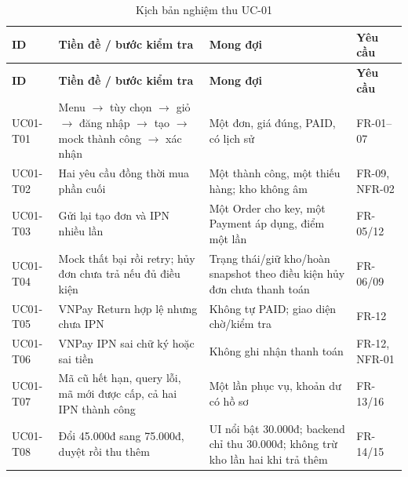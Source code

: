 \begin{longtable}{|>{\raggedright\arraybackslash}p{}|>{\raggedright\arraybackslash}p{}|>{\raggedright\arraybackslash}p{}|>{\raggedright\arraybackslash}p{}|}
\caption{Kịch bản nghiệm thu UC-01}\\\hline
\textbf{ID} & \textbf{Tiền đề / bước kiểm tra} & \textbf{Mong đợi} & \textbf{Yêu cầu} \\ \hline
\endfirsthead
\hline
\textbf{ID} & \textbf{Tiền đề / bước kiểm tra} & \textbf{Mong đợi} & \textbf{Yêu cầu} \\ \hline
\endhead
UC01-T01 & Menu \(\rightarrow\) tùy chọn \(\rightarrow\) giỏ \(\rightarrow\) đăng nhập \(\rightarrow\) tạo \(\rightarrow\) mock thành công \(\rightarrow\) xác nhận & Một đơn, giá đúng, PAID, có lịch sử & FR-01--07 \\ \hline
UC01-T02 & Hai yêu cầu đồng thời mua phần cuối & Một thành công, một thiếu hàng; kho không âm & FR-09, NFR-02 \\ \hline
UC01-T03 & Gửi lại tạo đơn và IPN nhiều lần & Một Order cho key, một Payment áp dụng, điểm một lần & FR-05/12 \\ \hline
UC01-T04 & Mock thất bại rồi retry; hủy đơn chưa trả nếu đủ điều kiện & Trạng thái/giữ kho/hoàn snapshot theo điều kiện hủy đơn chưa thanh toán & FR-06/09 \\ \hline
UC01-T05 & VNPay Return hợp lệ nhưng chưa IPN & Không tự PAID; giao diện chờ/kiểm tra & FR-12 \\ \hline
UC01-T06 & VNPay IPN sai chữ ký hoặc sai tiền & Không ghi nhận thanh toán & FR-12, NFR-01 \\ \hline
UC01-T07 & Mã cũ hết hạn, query lỗi, mã mới được cấp, cả hai IPN thành công & Một lần phục vụ, khoản dư có hồ sơ & FR-13/16 \\ \hline
UC01-T08 & Đổi 45.000đ sang 75.000đ, duyệt rồi thu thêm & UI nổi bật 30.000đ; backend chỉ thu 30.000đ; không trừ kho lần hai khi trả thêm & FR-14/15 \\ \hline
\end{longtable}
\endgroup

